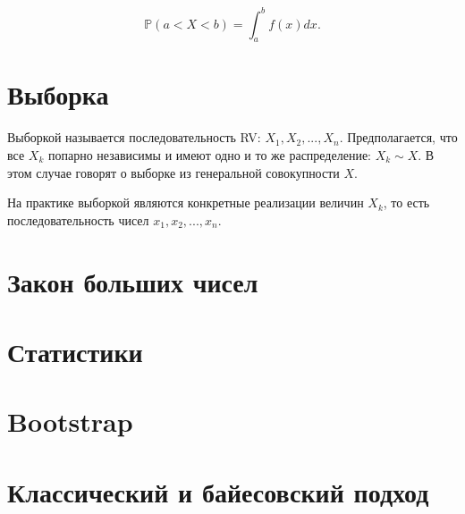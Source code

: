 $$
\mathbb{P}(a<X<b)=\int_{a}^{b}f(x)dx.
$$


\section{Выборка}

Выборкой называется последовательность RV: $X_1, X_2, ..., X_n$. Предполагается, что все $X_k$ попарно независимы и имеют одно и то же распределение: $X_k \sim X$. В этом случае говорят о выборке из генеральной совокупности $X$. 

На практике выборкой являются конкретные реализации величин $X_k$, то есть последовательность чисел $x_1, x_2, ..., x_n$.

\section{Закон больших чисел}

\section{Статистики}

\section{Bootstrap}

\section{Классический и байесовский подход}
